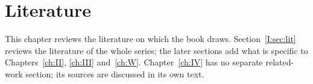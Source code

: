 \chapter{Literature}\label{ch:lit}
This chapter reviews the literature on which the book draws. Section~\ref{I:sec:lit} reviews the literature of the whole series; the later sections add what is specific to Chapters~\ref{ch:II}, \ref{ch:III} and~\ref{ch:W}. Chapter~\ref{ch:IV} has no separate related-work section; its sources are discussed in its own text.

\begingroup
\providecommand{\ov}{}\renewcommand{\ov}[1]{\overline{#1}}
\providecommand{\eps}{}\renewcommand{\eps}{\epsilon}
\providecommand{\A}{}\renewcommand{\A}{\mathbb{A}}
\providecommand{\C}{}\renewcommand{\C}{\mathbb{C}}
\providecommand{\Q}{}\renewcommand{\Q}{\mathbb{Q}}
\providecommand{\Z}{}\renewcommand{\Z}{\mathbb{Z}}
\providecommand{\cO}{}\renewcommand{\cO}{\mathcal{O}}
\providecommand{\gen}{}\renewcommand{\gen}{\mathrm{gen}}
\providecommand{\reg}{}\renewcommand{\reg}{\mathrm{reg}}
\providecommand{\tr}{}\renewcommand{\tr}{\operatorname{tr}}
\providecommand{\Gal}{}\renewcommand{\Gal}{\operatorname{Gal}}
\providecommand{\Aut}{}\renewcommand{\Aut}{\operatorname{Aut}}
\providecommand{\Nrd}{}\renewcommand{\Nrd}{\operatorname{Nrd}}
\providecommand{\Ad}{}\renewcommand{\Ad}{\operatorname{Ad}}
\providecommand{\Hom}{}\renewcommand{\Hom}{\operatorname{Hom}}
\providecommand{\Iso}{}\renewcommand{\Iso}{\operatorname{Iso}}
\providecommand{\vol}{}\renewcommand{\vol}{\operatorname{vol}}
\providecommand{\supp}{}\renewcommand{\supp}{\operatorname{supp}}
\providecommand{\diag}{}\renewcommand{\diag}{\operatorname{diag}}
\providecommand{\GL}{}\renewcommand{\GL}{\mathrm{GL}}
\providecommand{\SL}{}\renewcommand{\SL}{\mathrm{SL}}
\providecommand{\Gb}{}\renewcommand{\Gb}{\ov{G}}
\providecommand{\Zb}{}\renewcommand{\Zb}{\ov{Z}}
\providecommand{\GDb}{}\renewcommand{\GDb}{\ov{G}_D}
\providecommand{\pib}{}\renewcommand{\pib}{\ov{\pi}}
\providecommand{\ks}{}\renewcommand{\ks}{\kappa^{*}}
\providecommand{\Eb}{}\renewcommand{\Eb}{\ov{E}}
\providecommand{\Tb}{}\renewcommand{\Tb}{\ov{T}}
\providecommand{\cG}{}\renewcommand{\cG}{\mathcal{G}}
\providecommand{\cGb}{}\renewcommand{\cGb}{\ov{\mathcal{G}}}
\providecommand{\iD}{}\renewcommand{\iD}{\iota_D}
\providecommand{\iG}{}\renewcommand{\iG}{\iota_{\GL}}
\providecommand{\jj}{}\renewcommand{\jj}{\jmath}
\providecommand{\Pv}{}\renewcommand{\Pv}{\textbf{(P)}}
\providecommand{\Ev}{}\renewcommand{\Ev}{\textbf{(E)}}
\providecommand{\Ov}{}\renewcommand{\Ov}{\textbf{(O)}}
\providecommand{\Cv}{}\renewcommand{\Cv}{\textbf{(C)}}
